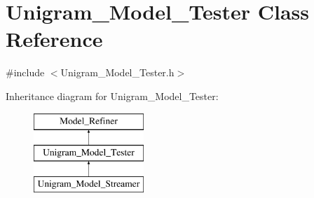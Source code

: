 \hypertarget{class_unigram___model___tester}{
\section{Unigram\_\-Model\_\-Tester Class Reference}
\label{class_unigram___model___tester}
}


{\ttfamily \#include $<$Unigram\_\-Model\_\-Tester.h$>$}

Inheritance diagram for Unigram\_\-Model\_\-Tester:\begin{figure}[H]
\begin{center}
\leavevmode
\includegraphics[height=3cm]{class_unigram___model___tester}
\end{center}
\end{figure}
